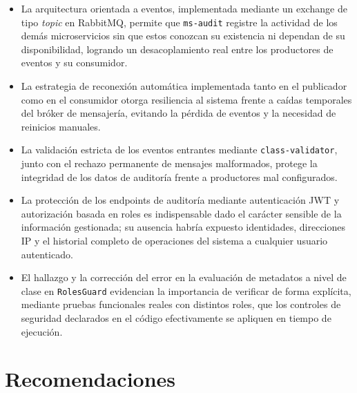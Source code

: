 \documentclass[12pt,letterpaper]{article}
\begin{document}
\begin{itemize}
  \item La arquitectura orientada a eventos, implementada mediante un exchange de tipo \emph{topic} en RabbitMQ, permite que \texttt{ms-audit} registre la actividad de los demás microservicios sin que estos conozcan su existencia ni dependan de su disponibilidad, logrando un desacoplamiento real entre los productores de eventos y su consumidor.
  \item La estrategia de reconexión automática implementada tanto en el publicador como en el consumidor otorga resiliencia al sistema frente a caídas temporales del bróker de mensajería, evitando la pérdida de eventos y la necesidad de reinicios manuales.
  \item La validación estricta de los eventos entrantes mediante \texttt{class-validator}, junto con el rechazo permanente de mensajes malformados, protege la integridad de los datos de auditoría frente a productores mal configurados.
  \item La protección de los endpoints de auditoría mediante autenticación JWT y autorización basada en roles es indispensable dado el carácter sensible de la información gestionada; su ausencia habría expuesto identidades, direcciones IP y el historial completo de operaciones del sistema a cualquier usuario autenticado.
  \item El hallazgo y la corrección del error en la evaluación de metadatos a nivel de clase en \texttt{RolesGuard} evidencian la importancia de verificar de forma explícita, mediante pruebas funcionales reales con distintos roles, que los controles de seguridad declarados en el código efectivamente se apliquen en tiempo de ejecución.
\end{itemize}

\section{Recomendaciones}
\end{document}

